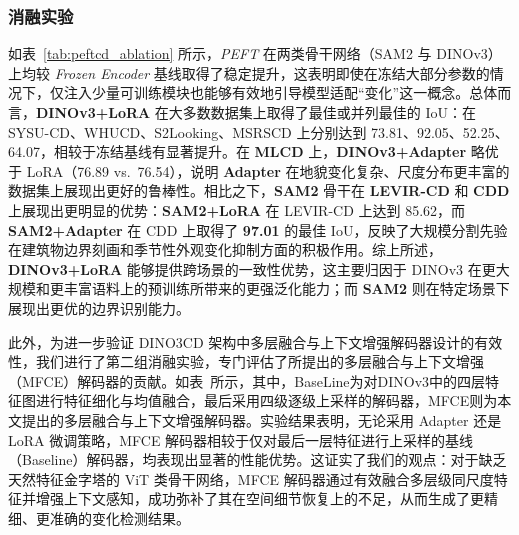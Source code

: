 \subsubsection{消融实验}

如表~\ref{tab:peftcd_ablation} 所示，\emph{PEFT} 在两类骨干网络（SAM2 与 DINOv3）上均较 \emph{Frozen Encoder} 基线取得了稳定提升，这表明即使在冻结大部分参数的情况下，仅注入少量可训练模块也能够有效地引导模型适配“变化”这一概念。总体而言，\textbf{DINOv3+LoRA} 在大多数数据集上取得了最佳或并列最佳的 IoU：在 SYSU-CD、WHUCD、S2Looking、MSRSCD 上分别达到 73.81、92.05、52.25、64.07，相较于冻结基线有显著提升。在 \textbf{MLCD} 上，\textbf{DINOv3+Adapter} 略优于 LoRA（76.89 vs.\ 76.54），说明 \textbf{Adapter} 在地貌变化复杂、尺度分布更丰富的数据集上展现出更好的鲁棒性。相比之下，\textbf{SAM2} 骨干在 \textbf{LEVIR-CD} 和 \textbf{CDD} 上展现出更明显的优势：\textbf{SAM2+LoRA} 在 LEVIR-CD 上达到 85.62，而 \textbf{SAM2+Adapter} 在 CDD 上取得了 \textbf{97.01} 的最佳 IoU，反映了大规模分割先验在建筑物边界刻画和季节性外观变化抑制方面的积极作用。综上所述，\textbf{DINOv3+LoRA} 能够提供跨场景的一致性优势，这主要归因于 DINOv3 在更大规模和更丰富语料上的预训练所带来的更强泛化能力；而 \textbf{SAM2} 则在特定场景下展现出更优的边界识别能力。

此外，为进一步验证 DINO3CD 架构中多层融合与上下文增强解码器设计的有效性，我们进行了第二组消融实验，专门评估了所提出的多层融合与上下文增强（MFCE）解码器的贡献。如表~\label{tab:peftcd_dino3cd_ablation}所示，其中，BaseLine为对DINOv3中的四层特征图进行特征细化与均值融合，最后采用四级逐级上采样的解码器，MFCE则为本文提出的多层融合与上下文增强解码器。实验结果表明，无论采用 Adapter 还是 LoRA 微调策略，MFCE 解码器相较于仅对最后一层特征进行上采样的基线（Baseline）解码器，均表现出显著的性能优势。这证实了我们的观点：对于缺乏天然特征金字塔的 ViT 类骨干网络，MFCE 解码器通过有效融合多层级同尺度特征并增强上下文感知，成功弥补了其在空间细节恢复上的不足，从而生成了更精细、更准确的变化检测结果。

